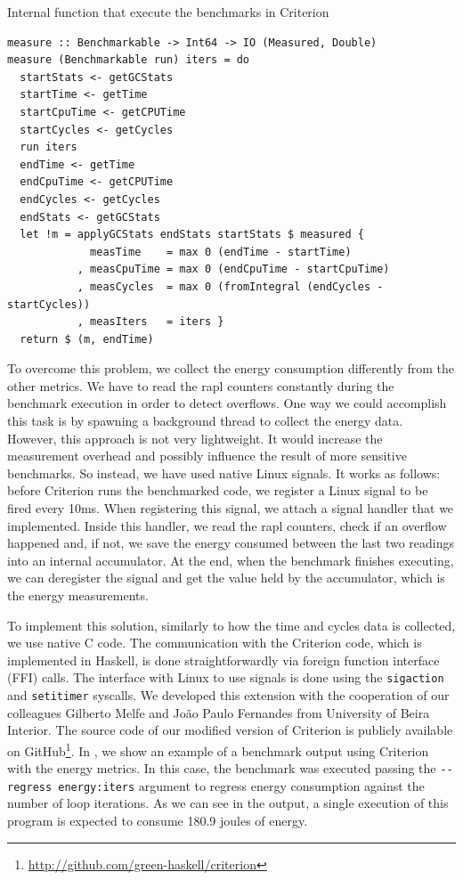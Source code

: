 \begin{listing}
  \caption{Internal function that execute the benchmarks in Criterion}
  \begin{verbatim}
measure :: Benchmarkable -> Int64 -> IO (Measured, Double)
measure (Benchmarkable run) iters = do
  startStats <- getGCStats
  startTime <- getTime
  startCpuTime <- getCPUTime
  startCycles <- getCycles
  run iters
  endTime <- getTime
  endCpuTime <- getCPUTime
  endCycles <- getCycles
  endStats <- getGCStats
  let !m = applyGCStats endStats startStats $ measured {
             measTime    = max 0 (endTime - startTime)
           , measCpuTime = max 0 (endCpuTime - startCpuTime)
           , measCycles  = max 0 (fromIntegral (endCycles - startCycles))
           , measIters   = iters }
  return $ (m, endTime)
  \end{verbatim}
  \label{code:crit-measure}
\end{listing}

To overcome this problem, we collect the energy consumption differently from the other metrics. We have to read the \ac{rapl} counters constantly during the benchmark execution in order to detect overflows. One way we could accomplish this task is by spawning a background thread to collect the energy data. However, this approach is not very lightweight. It would increase the measurement overhead and possibly influence the result of more sensitive benchmarks. So instead, we have used native Linux signals. It works as follows: before Criterion runs the benchmarked code, we register a Linux signal to be fired every 10ms. When registering this signal, we attach a signal handler that we implemented. Inside this handler, we read the \ac{rapl} counters, check if an overflow happened and, if not, we save the energy consumed between the last two readings into an internal accumulator. At the end, when the benchmark finishes executing, we can deregister the signal and get the value held by the accumulator, which is the energy measurements.

To implement this solution, similarly to how the time and cycles data is collected, we use native C code. The communication with the Criterion code, which is implemented in Haskell, is done straightforwardly via foreign function interface (FFI) calls. The interface with Linux to use signals is done using the \texttt{sigaction} and \texttt{setitimer} syscalls. We developed this extension with the cooperation of our colleagues Gilberto Melfe and João Paulo Fernandes from University of Beira Interior. The source code of our modified version of Criterion is publicly available on GitHub\footnote{\url{http://github.com/green-haskell/criterion}}. In , we show an example of a benchmark output using Criterion with the energy metrics. In this case, the benchmark was executed passing the \texttt{-{}-regress energy:iters} argument to regress energy consumption against the number of loop iterations. As we can see in the output, a single execution of this program is expected to consume 180.9 joules of energy.


